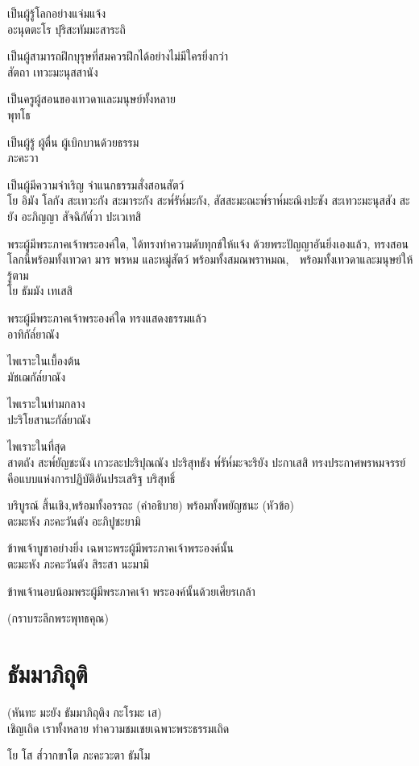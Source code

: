 \documentclass{article}
\begin{document}
เป็นผู้รู้โลกอย่างแจ่มแจ้ง\\
อะนุตตะโร ปุริสะทัมมะสาระถิ

เป็นผู้สามารถฝึกบุรุษที่สมควรฝึกได้อย่างไม่มีใครยิ่งกว่า\\
สัตถา เทวะมะนุสสานัง

เป็นครูผู้สอนของเทวดาและมนุษย์ทั้งหลาย\\
พุทโธ

เป็นผู้รู้ ผู้ตื่น ผู้เบิกบานด้วยธรรม\\
ภะคะวา

เป็นผู้มีความจำเริญ จำแนกธรรมสั่งสอนสัตว์\\
โย อิมัง โลกัง สะเทวะกัง สะมาระกัง สะพ๎รัห๎มะกัง, 
สัสสะมะณะพ๎ราห๎มะณิงปะชัง สะเทวะมะนุสสัง
 สะยัง อะภิญญา สัจฉิกัต๎วา ปะเวเทสิ
 
พระผู้มีพระภาคเจ้าพระองค์ใด, ได้ทรงทำความดับทุกข์ให้แจ้ง 
ด้วยพระปัญญาอันยิ่งเองแล้ว, ทรงสอนโลกนี้พร้อมทั้งเทวดา 
มาร พรหม และหมู่สัตว์ พร้อมทั้งสมณพราหมณ, 
พร้อมทั้งเทวดาและมนุษย์ให้รู้ตาม\\
โย ธัมมัง เทเสสิ

พระผู้มีพระภาคเจ้าพระองค์ใด ทรงแสดงธรรมแล้ว\\
อาทิกัล๎ยาณัง

ไพเราะในเบื้องต้น\\
มัชเฌกัล๎ยาณัง

ไพเราะในท่ามกลาง\\
ปะริโยสานะกัล๎ยาณัง

ไพเราะในที่สุด\\
สาตถัง สะพ๎ยัญชะนัง เกวะละปะริปุณณัง ปะริสุทธัง พ๎รัห๎มะจะริยัง ปะกาเสสิ
ทรงประกาศพรหมจรรย์ คือแบบแห่งการปฏิบัติอันประเสริฐ บริสุทธิ์

บริบูรณ์ สิ้นเชิง,พร้อมทั้งอรรถะ (คำอธิบาย) พร้อมทั้งพยัญชนะ (หัวข้อ)\\
ตะมะหัง ภะคะวันตัง อะภิปูชะยามิ

ข้าพเจ้าบูชาอย่างยิ่ง เฉพาะพระผู้มีพระภาคเจ้าพระองค์นั้น\\
ตะมะหัง ภะคะวันตัง สิระสา นะมามิ

ข้าพเจ้านอบน้อมพระผู้มีพระภาคเจ้า พระองค์นั้นด้วยเศียรเกล้า
\begin{center}
(กราบระลึกพระพุทธคุณ)
\end{center}
\pagebreak
\section{ธัมมาภิถุติ}
\begin{center}
(หันทะ มะยัง ธัมมาภิถุติง กะโรมะ เส)\\
เชิญเถิด เราทั้งหลาย ทำความชมเชยเฉพาะพระธรรมเถิด
\end{center}
โย โส ส๎วากขาโต ภะคะวะตา ธัมโม
\end{document}
